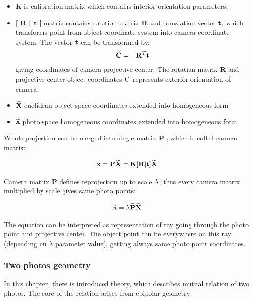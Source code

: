 \documentclass[a4paper,12pt]{article}
\newcommand{\ematr}[1]{
{\bf #1}
}
\newcommand{\evect}[1]{
{\bf #1}
}
\newcommand{\ehvect}[1]{
{\bf \widetilde{#1}}
}
\newcommand{\escal}[1]{
{\it #1}
}
\begin{document}
\begin{itemize}
\item \ematr{K} is calibration matrix which contains interior orientation parameters.  
\item \ematr{[\ematr{R}|\evect{t}]} matrix contains rotation matrix\ematr{R} and translation vector $\evect{t}$, 
	      which transforms point from object coordinate system 
	      into camera coordinate system. 
	      The vector $\evect{t}$ can  be transformed by:
	      \begin{equation}
	      \ehvect{C} = - \ematr{R}^{T}\evect{t}
	      \end{equation}
	      giving coordinates of camera projective center. The rotation matrix \ematr{R} and projective 
	      center object coordinates $\evect{C}$
	      represents exterior orientation of camera.   
\item $\ehvect{X}$ euclidean object space coordinates extended into homogeneous form
\item $\ehvect{x}$ photo space homogeneous coordinates extended into homogeneous form
\end{itemize}

Whole projection can be merged into single matrix \ematr{P}, which is called camera matrix:

\begin{equation}
\label{eq:p_abbr}
\ehvect{x} =  \ematr{P} \ehvect{X} = \ematr{K} \ematr{[}\ematr{R}|\evect{t}\ematr{]} \ehvect{X}
\end{equation}

Camera matrix \ematr{P} defines reprojection up to scale $\escal{\lambda}$, thus every camera matrix multiplied by scale gives same photo points:

\begin{equation}
\ehvect{x}=\lambda\ehvect{P}\ehvect{X}
 \end{equation}

The equation can be interpreted as representation of ray going through the photo point and projective center. 
The object point can be everywhere on this ray (depending on $\lambda$ parameter value), getting always 
same photo point coordinates.

\subsubsection{Two photos geometry}

In this chapter, there is introduced theory, which describes mutual relation of two photos. 
The core of the relation arises from epipolar geometry.
\end{document}
